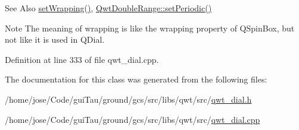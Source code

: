 \begin{DoxySeeAlso}{See Also}
\hyperlink{class_qwt_dial_a8d2cfa17acf266fd0273f0f477895499}{set\-Wrapping()}, \hyperlink{class_qwt_double_range_a95fa6a4e44fc47726d939155bb6f6f1f}{Qwt\-Double\-Range\-::set\-Periodic()} 
\end{DoxySeeAlso}
\begin{DoxyNote}{Note}
The meaning of wrapping is like the wrapping property of Q\-Spin\-Box, but not like it is used in Q\-Dial. 
\end{DoxyNote}


Definition at line 333 of file qwt\-\_\-dial.\-cpp.



The documentation for this class was generated from the following files\-:\begin{DoxyCompactItemize}
\item 
/home/jose/\-Code/gui\-Tau/ground/gcs/src/libs/qwt/src/\hyperlink{qwt__dial_8h}{qwt\-\_\-dial.\-h}\item 
/home/jose/\-Code/gui\-Tau/ground/gcs/src/libs/qwt/src/\hyperlink{qwt__dial_8cpp}{qwt\-\_\-dial.\-cpp}\end{DoxyCompactItemize}
